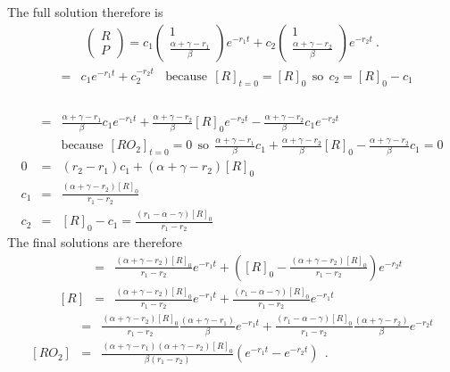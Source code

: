 \documentclass[10pt, a4paper]{article}
\begin{document}
The full solution therefore is 
\begin{eqnarray*}
\begin{pmatrix}
R \\
P 
\end{pmatrix}
= c_1 \begin{pmatrix}1 \\ \frac{\alpha + \gamma - r_1}{\beta} \end{pmatrix} e^{-r_1t} + c_2 \begin{pmatrix}1 \\ \frac{\alpha + \gamma - r_2}{\beta} \end{pmatrix} e^{-r_2t}  \: . 
\end{eqnarray*}
\begin{eqnarray*}
[R] &=& c_1e^{-r_1t} + c_2^{-r_2t} \:\:\:\: \text{because} \:\ [R]_{t = 0} = [R]_0  \:\: \text{so}  \:\: c_2 = [R]_0 - c_1 \\
\end{eqnarray*}
\\
\begin{eqnarray*}
[RO_2] &=& \frac{\alpha + \gamma - r_1}{\beta}c_1e^{-r_1t} + \frac{\alpha + \gamma - r_2}{\beta}[R]_0 e^{-r_2t} -  \frac{\alpha + \gamma - r_2}{\beta}c_1 e^{-r_2t} \\
&&  \text{because} \:\ [RO_2]_{t = 0} = 0 \:\: \text{so}  \:\: \frac{\alpha + \gamma - r_1}{\beta}c_1 + \frac{\alpha + \gamma - r_2}{\beta}[R]_0  -  \frac{\alpha + \gamma - r_2}{\beta}c_1 = 0  \\
0 &=& (r_2 - r_1)c_1 + (\alpha + \gamma - r_2)[R]_0 \\
c_1 &=& \frac{(\alpha + \gamma - r_2)[R]_0}{r_1 - r_2} \\
c_2 &=& [R]_0 - c_1 = \frac{(r_1 - \alpha - \gamma)[R]_0}{r_1 - r_2}
\end{eqnarray*}
The final solutions are therefore 
\begin{eqnarray*}
[R] &=& \frac{(\alpha + \gamma - r_2)[R]_0}{r_1 - r_2}e^{-r_1t} + ([R]_0 - \frac{(\alpha + \gamma - r_2)[R]_0}{r_1 - r_2})e^{-r_2t} ~\\
\phantom{}[R] &=& \frac{(\alpha + \gamma - r_2)[R]_0}{r_1 - r_2}e^{-r_1t} + \frac{(r_1 - \alpha - \gamma)[R]_0}{r_1 - r_2}e^{-r_1t}
\end{eqnarray*}
\begin{eqnarray*}
[RO_2] &=& \frac{(\alpha + \gamma - r_2)[R]_0}{r_1 - r_2} \frac{(\alpha + \gamma - r_1)}{\beta} e^{-r_1t} + 
\frac{(r_1 - \alpha - \gamma)[R]_0}{r_1 - r_2} \frac{(\alpha + \gamma - r_2)}{\beta}  e^{-r_2t} \\
\phantom{}[RO_2] &=& \frac{(\alpha + \gamma - r_1)(\alpha + \gamma - r_2)[R]_0}{\beta(r_1 - r_2)}\left(e^{-r_1t} - e^{-r_2t} \right) \:\: .
\end{eqnarray*}
\end{document}

